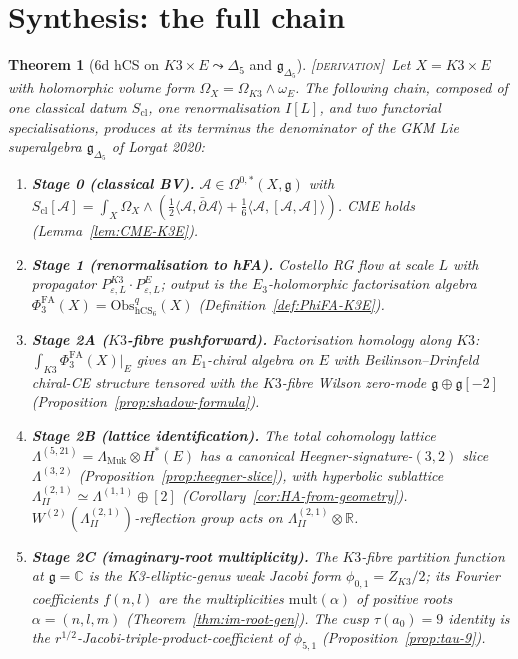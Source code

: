 \documentclass[11pt]{amsart}
\providecommand{\C}{\mathbb{C}}
\providecommand{\R}{\mathbb{R}}
\providecommand{\cA}{\mathcal{A}}
\providecommand{\dbar}{\bar{\partial}}
\providecommand{\g}{\mathfrak{g}}
\providecommand{\Obs}{\mathrm{Obs}}
\providecommand{\hCS}{\mathrm{hCS}}
\providecommand{\Eone}{E_{1}}
\providecommand{\Muk}{\Lambda_{\mathrm{Muk}}}
\providecommand{\HB}{\Lambda^{(2,1)}_{I\!I}}
\providecommand{\LamF}{\Lambda^{(3,2)}}
\providecommand{\Gdelta}{\mathfrak{g}_{\Delta_{5}}}
\providecommand{\PhiFA}{\Phi^{\mathrm{FA}}}
\providecommand{\ClaimStatusDerivation}{\textsc{[derivation]}}
\theoremstyle{plain}
\newtheorem{theorem}{Theorem}[section]
\theoremstyle{definition}
\theoremstyle{remark}
\begin{document}
\section{Synthesis: the full chain}

\begin{theorem}[$6$d hCS on $K3\times E\leadsto \Delta_{5}$ and $\Gdelta$]
\label{thm:hCS-to-Delta5}
\ClaimStatusDerivation\
Let $X = K3\times E$ with holomorphic volume form $\Omega_{X}=
\Omega_{K3}\wedge\omega_{E}$. The following chain, composed of one
classical datum $S_{\mathrm{cl}}$, one renormalisation $I[L]$, and two
functorial specialisations, produces at its terminus the denominator
of the GKM Lie superalgebra $\Gdelta$ of Lorgat 2020:

\begin{enumerate}
\item[(S)] \textbf{Stage 0 (classical BV).}
$\cA\in\Omega^{0,\ast}(X,\g)$ with
$S_{\mathrm{cl}}[\cA] = \int_{X}\Omega_{X}\wedge(\tfrac12\langle\cA,
\dbar\cA\rangle + \tfrac16\langle\cA,[\cA,\cA]\rangle)$. CME holds
(Lemma~\ref{lem:CME-K3E}).

\item[(Q)] \textbf{Stage 1 (renormalisation to hFA).} Costello RG flow
at scale $L$ with propagator $P^{K3}_{\varepsilon, L}\cdot P^{E}_{\varepsilon,L}$;
output is the $E_{3}$-holomorphic factorisation algebra
$\PhiFA_{3}(X) = \Obs^{q}_{\hCS_{6}}(X)$
(Definition~\ref{def:PhiFA-K3E}).

\item[(K)] \textbf{Stage 2A ($K3$-fibre pushforward).} Factorisation
homology along $K3$:
$\int_{K3}\PhiFA_{3}(X)|_{E}$ gives an $\Eone$-chiral algebra on $E$
with Beilinson--Drinfeld chiral-CE structure tensored with the
$K3$-fibre Wilson zero-mode $\g\oplus\g[-2]$
(Proposition~\ref{prop:shadow-formula}).

\item[(L)] \textbf{Stage 2B (lattice identification).}
The total cohomology lattice
$\Lambda^{(5,21)} = \Muk\otimes H^{\ast}(E)$ has a canonical
Heegner-signature-$(3,2)$ slice $\LamF$
(Proposition~\ref{prop:heegner-slice}), with hyperbolic sublattice
$\HB\simeq\Lambda^{(1,1)}\oplus[2]$
(Corollary~\ref{cor:HA-from-geometry}).
$W^{(2)}(\HB)$-reflection group acts on $\HB\otimes\R$.

\item[(I)] \textbf{Stage 2C (imaginary-root multiplicity).}
The $K3$-fibre partition function at $\g=\C$ is the K3-elliptic-genus
weak Jacobi form $\phi_{0,1}=Z_{K3}/2$; its Fourier coefficients
$f(n, l)$ are the multiplicities $\mathrm{mult}(\alpha)$ of positive
roots $\alpha = (n,l,m)$ (Theorem~\ref{thm:im-root-gen}). The cusp
$\tau(a_{0})=9$ identity is the
$r^{1/2}$-Jacobi-triple-product-coefficient of $\phi_{5,1}$
(Proposition~\ref{prop:tau-9}).


\end{enumerate}
\end{theorem}
\end{document}

